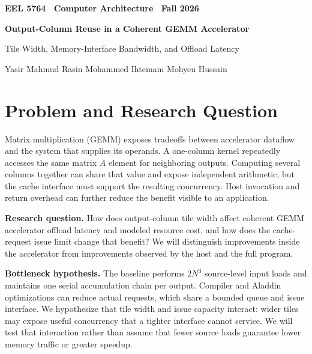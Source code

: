 \documentclass[10pt,letterpaper]{article}
\begin{document}
\begin{center}
{\small\color{navy}\bfseries EEL 5764 \textbar\ Computer Architecture \textbar\ Fall 2026}\par
\vspace{4pt}
{\LARGE\bfseries Output-Column Reuse in a Coherent GEMM Accelerator}\par
\vspace{2pt}
{\large Tile Width, Memory-Interface Bandwidth, and Offload Latency}\par
\vspace{5pt}
{\small Yasir Mahmud \quad\textbar\quad Rasin Mohammed Ihtemam
\quad\textbar\quad Mohyeu Hussain}
\end{center}
\vspace{-5pt}

\section{Problem and Research Question}
Matrix multiplication (GEMM) exposes tradeoffs between accelerator dataflow and the system that supplies its operands. A one-column kernel repeatedly accesses the same matrix $A$ element for neighboring outputs. Computing several columns together can share that value and expose independent arithmetic, but the cache interface must support the resulting concurrency. Host invocation and return overhead can further reduce the benefit visible to an application.

\textbf{Research question.} How does output-column tile width affect coherent GEMM accelerator offload latency and modeled resource cost, and how does the cache-request issue limit change that benefit? We will distinguish improvements inside the accelerator from improvements observed by the host and the full program.

\textbf{Bottleneck hypothesis.} The baseline performs $2N^3$ source-level input loads and maintains one serial accumulation chain per output. Compiler and Aladdin optimizations can reduce actual requests, which share a bounded queue and issue interface. We hypothesize that tile width and issue capacity interact: wider tiles may expose useful concurrency that a tighter interface cannot service. We will test that interaction rather than assume that fewer source loads guarantee lower memory traffic or greater speedup.
\end{document}
